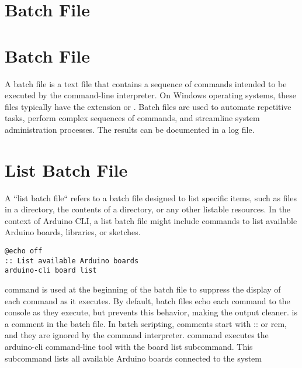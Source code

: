 %
%


\section{Batch File}

\section{Batch File}

A batch file is a text file that contains a sequence of commands intended to be executed by the command-line interpreter. On Windows operating systems, these files typically have the extension  or . Batch files are used to automate repetitive tasks, perform complex sequences of commands, and streamline system administration processes. The results can be documented in a log file. 

\section{List Batch File}

A ``list batch file`` refers to a batch file designed to list specific items, such as files in a directory, the contents of a directory, or any other listable resources. In the context of Arduino CLI, a list batch file might include commands to list available Arduino boards, libraries, or sketches.

\begin{center}
    \begin{lstlisting}
@echo off
:: List available Arduino boards
arduino-cli board list
    \end{lstlisting}
\end{center}

 command is used at the beginning of the batch file to suppress the display of each command as it executes. By default, batch files echo each command to the console as they execute, but  prevents this behavior, making the output cleaner. 
 is a comment in the batch file. In batch scripting, comments start with :: or rem, and they are ignored by the command interpreter.
 command executes the arduino-cli command-line tool with the board list subcommand. This subcommand lists all available Arduino boards connected to the system

